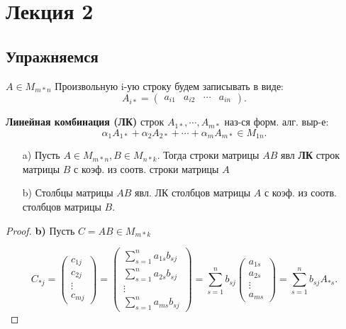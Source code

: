 \section{Лекция 2}

\subsection{Упражняемся}
$A \in M_{m*n}$
 Произвольную i-ую строку будем записывать в виде:
 \[
     A_{i*} = \begin{pmatrix} a_{i1} & a_{i2} & \cdots & a_{in}\end{pmatrix}
 .\] 

 \begin{definition}
     \textbf{Линейная комбинация (ЛК)} строк $A_{1*}, \cdots , A_{m*}$ наз-ся форм. алг. выр-е:
 \[
 \alpha_1 A_{1*} + \alpha_2 A_{2*} + \cdots + \alpha_m A_{m*}  \in M_{1n}
 .\] 
 \end{definition}

 \begin{statement}
     \begin{itemize}
         \item [a) ]  Пусть $A  \in M_{m*n}, B \in M_{n*k}$. Тогда строки матрицы $AB$ явл \textbf{ЛК} строк матрицы $B$ с коэф. из соотв. строки матрицы $A$
         \item [b) ] Столбцы матрицы $AB$ явл. ЛК столбцов матрицы $A$ с коэф. из соотв. столбцов матрицы $B$. 
     \end{itemize}

 \end{statement}
 \begin{proof}
 \textbf{b) } Пусть $C = AB  \in M_{m*k}$

  \[
      C_{*j} = \begin{pmatrix}c_{1j} \\ c_{2j} \\ \vdots \\ c_{mj}\end{pmatrix} = \begin{pmatrix} \sum_{s = 1}^{n} a_{1s}b_{sj} \\ \sum_{s = 1}^{n}  a_{2s} b_{sj} \\ \vdots \\ \sum_{s = 1}^{n} a_{ms}b_{sj}  \end{pmatrix} = \sum_{s = 1}^{n} b_{sj} \begin{pmatrix}a_{1s} \\ a_{2s} \\ \vdots \\ a_{ms} \end{pmatrix} = \sum_{s = 1}^{n}  b_{sj} A_{*s}
  .\] 
 \end{proof}
 
